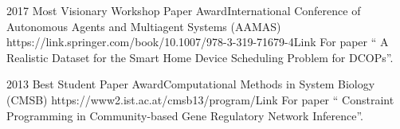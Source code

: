 \begin{awards}
	\awardentryD
	{2017}
	{Most Visionary Workshop Paper Award}{International Conference of 
	Autonomous Agents and Multiagent Systems (AAMAS)}
   {https://link.springer.com/book/10.1007/978-3-319-71679-4}{Link}
   {For paper ``
   {A Realistic Dataset for the Smart Home Device Scheduling Problem for DCOPs}''.}

	\awardentryD
	{2013}
	{Best Student Paper Award}{Computational Methods in System Biology (CMSB)}
	{https://www2.ist.ac.at/cmsb13/program/}{Link}
	{For paper ``
	{Constraint Programming in Community-based Gene Regulatory Network Inference}''.} 

\end{awards}




